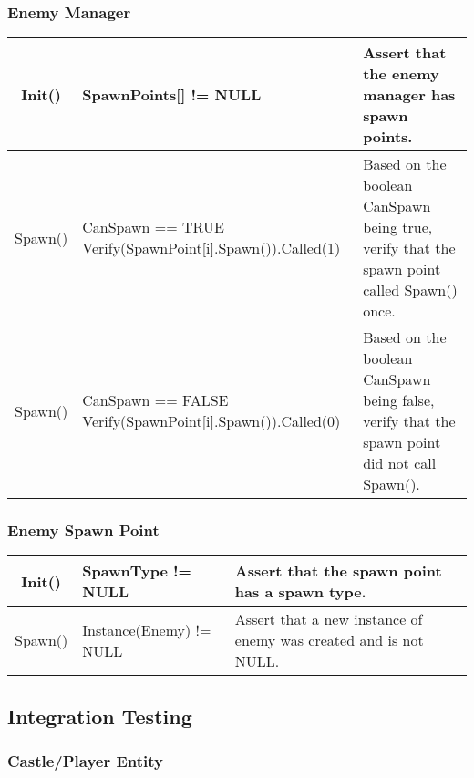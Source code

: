 \subsubsection{Enemy Manager}

\begin{table}[H]
	\renewcommand*{\arraystretch}{1.5}
	\centering
	\begin{tabular}{ | c | C{7cm} | L{4cm} |}
		\hline
		Init()
			&	SpawnPoints[] != NULL
			&	Assert that the enemy manager has spawn points.\\
		\hline
		Spawn()
			&	CanSpawn == TRUE \newline
				Verify(SpawnPoint[i].Spawn()).Called(1)
			&	Based on the boolean CanSpawn being true, verify that the spawn point called Spawn() once.\\
		\hline
		Spawn()
			&	CanSpawn == FALSE \newline
				Verify(SpawnPoint[i].Spawn()).Called(0)
			& Based on the boolean CanSpawn being false, verify that the spawn point did not call Spawn().\\
		\hline
	\end{tabular}
\end{table}

\subsubsection{Enemy Spawn Point}

\begin{table}[H]
	\renewcommand*{\arraystretch}{1.5}
	\centering
	\begin{tabular}{ | c | C{6.2cm} | L{4cm} |}
		\hline
		Init()
			&	SpawnType != NULL
			&	Assert that the spawn point has a spawn type.\\
		\hline
		Spawn()
			&	Instance(Enemy) != NULL
			&	Assert that a new instance of enemy was created and is not NULL.\\
		\hline
	\end{tabular}
\end{table}

\subsection{Integration Testing}

\subsubsection{Castle/Player Entity}

